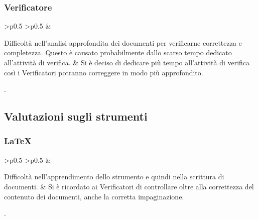 \subsubsection{Verificatore}
\renewcommand{\arraystretch}{1.5}
\begin{longtable}{ 
    >{}p{} 
        >{}p{}
}
\rowcolorhead
\centering {} &

\centering {} 
\endfirsthead	
\endhead
Difficoltà nell’analisi approfondita dei documenti per verificarne correttezza e completezza. Questo è causato probabilmente dallo scarso tempo dedicato all'attività di verifica. & Si è deciso di dedicare più tempo all'attività di verifica così i Verificatori potranno correggere in modo più approfondito. \\
\caption{Tabella problemi verificatore}
    \end{longtable}.

\subsection{Valutazioni sugli strumenti}

\subsubsection{\LaTeX}
\renewcommand{\arraystretch}{1.5}
\begin{longtable}{ 
    >{}p{} 
        >{}p{}
}
\rowcolorhead
\centering {} &

\centering {} 
\endfirsthead	
\endhead
Difficoltà nell'apprendimento dello strumento e quindi nella scrittura di documenti. & Si è ricordato ai Verificatori di controllare oltre alla correttezza del contenuto dei documenti, anche la corretta impaginazione. \\
\caption{Tabella problemi \LaTeX}
    \end{longtable}.
